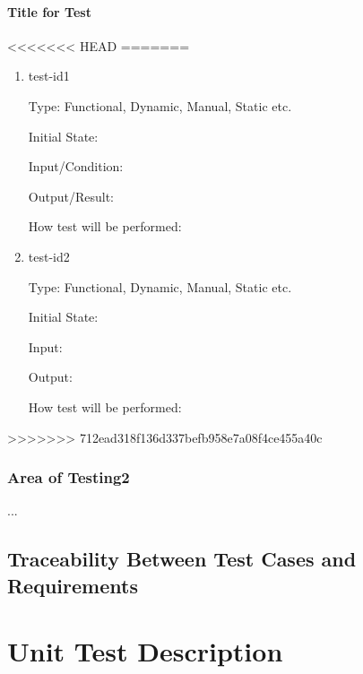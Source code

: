 \documentclass[12pt, titlepage]{article}
\begin{document}
\begin{enumerate}
\paragraph{Title for Test}

<<<<<<< HEAD
=======
\begin{enumerate}

\item{test-id1\\}

Type: Functional, Dynamic, Manual, Static etc.
					
Initial State: 
					
Input/Condition: 
					
Output/Result: 
					
How test will be performed: 
					
\item{test-id2\\}

Type: Functional, Dynamic, Manual, Static etc.
					
Initial State: 
					
Input: 
					
Output: 
					
How test will be performed: 

\end{enumerate}

>>>>>>> 712ead318f136d337befb958e7a08f4ce455a40c
\subsubsection{Area of Testing2}

...

\subsection{Traceability Between Test Cases and Requirements}


\section{Unit Test Description}



\end{enumerate}
\end{document}
